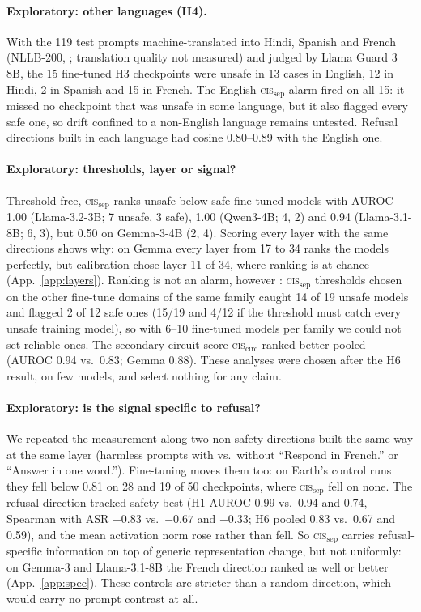 \documentclass[11pt]{article}
\newcommand{\cissep}{\textsc{cis}$_{\text{sep}}$}
\begin{document}
\paragraph{Exploratory: other languages (H4).} With the 119 test prompts machine-translated into Hindi, Spanish and
French (NLLB-200, \citealp{nllbteam2022nllb}; translation quality not measured) and judged by Llama Guard 3 8B, the 15
fine-tuned H3 checkpoints were unsafe in 13 cases in English, 12 in Hindi, 2 in Spanish and 15 in French. The English
\cissep{} alarm fired on all 15: it missed no checkpoint that was unsafe in some language, but it also flagged every
safe one, so drift confined to a non-English language remains untested. Refusal directions built in each language
had cosine 0.80--0.89 with the English one.

\paragraph{Exploratory: thresholds, layer or signal?} Threshold-free, \cissep{} ranks unsafe below safe fine-tuned models
with AUROC 1.00 (Llama-3.2-3B; 7 unsafe, 3 safe), 1.00 (Qwen3-4B; 4, 2) and 0.94 (Llama-3.1-8B; 6, 3), but 0.50 on
Gemma-3-4B (2, 4). Scoring every layer with the same directions shows why: on Gemma every layer from 17 to 34 ranks the
models perfectly, but calibration chose layer 11 of 34, where ranking is at chance (App.~\ref{app:layers}). Ranking is
not an alarm, however \citep{gao2026alarm}: \cissep{} thresholds chosen on the other fine-tune domains of the same
family caught 14 of 19 unsafe models and flagged 2 of 12 safe ones (15/19 and 4/12 if the threshold must catch every
unsafe training model), so with 6--10 fine-tuned models per family we could not set reliable ones. The secondary circuit score
\textsc{cis}$_{\text{circ}}$ ranked better pooled (AUROC 0.94 vs.\ 0.83; Gemma 0.88). These
analyses were chosen after the H6 result, on few models, and select nothing for any claim.

\paragraph{Exploratory: is the signal specific to refusal?} We repeated the measurement along two non-safety
directions built the same way at the same layer (harmless prompts with vs.\ without ``Respond in French.'' or
``Answer in one word.''). Fine-tuning moves them too: on Earth's control runs they fell below 0.81 on 28 and 19 of 50
checkpoints, where \cissep{} fell on none. The refusal direction tracked safety best (H1 AUROC 0.99 vs.\ 0.94 and 0.74,
Spearman with ASR $-0.83$ vs.\ $-0.67$ and $-0.33$; H6 pooled 0.83 vs.\ 0.67 and 0.59), and the mean activation norm
rose rather than fell. So \cissep{} carries refusal-specific information on top of generic representation change, but
not uniformly: on Gemma-3 and Llama-3.1-8B the French direction ranked as well or better (App.~\ref{app:spec}). These
controls are stricter than a random direction, which would carry no prompt contrast at all.
\end{document}
